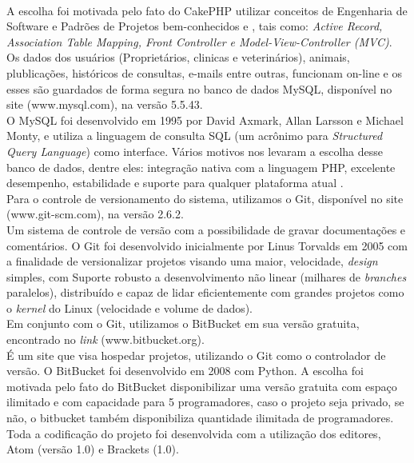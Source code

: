 \\
\indent
A escolha foi motivada pelo fato do CakePHP utilizar conceitos de Engenharia de Software e Padrões de Projetos bem-conhecidos
\cite{Gamma1994} e
\cite{Fowler2003}, tais como: {\it Active Record, Association Table Mapping, Front Controller e Model-View-Controller (MVC)}.
\\
\indent
Os dados dos usuários (Proprietários, clinicas e veterinários), animais, plublicações, históricos de consultas, e-mails entre outras, funcionam on-line e os esses são guardados de forma segura no banco de dados MySQL, disponível no site (www.mysql.com), na versão 5.5.43. 
\\
\indent
O MySQL foi desenvolvido em 1995 por David Axmark, Allan Larsson e Michael Monty, e utiliza a linguagem de consulta SQL (um acrônimo para {\it Structured Query Language}) como interface. Vários motivos nos levaram a escolha desse banco de dados, dentre eles: integração nativa com a linguagem PHP, excelente desempenho, estabilidade e suporte para qualquer plataforma atual \cite{Suehring2002}.
\\
\indent
Para o controle de versionamento do sistema, utilizamos o Git, disponível no site (www.git-scm.com), na versão 2.6.2. 
\\
\indent
Um sistema de controle de versão com a possibilidade de gravar documentações e comentários. O Git foi desenvolvido inicialmente por Linus Torvalds em 2005 com a finalidade de versionalizar projetos visando uma maior, velocidade, {\it design} simples, com Suporte robusto a desenvolvimento não linear (milhares de {\it branches} paralelos), distribuído e capaz de lidar eficientemente com grandes projetos como o {\it kernel} do Linux (velocidade e volume de dados).
\\
\indent 
Em conjunto com o Git, utilizamos o BitBucket em sua versão gratuita, encontrado no {\it link} (www.bitbucket.org).
\\
\indent
 É um site que visa hospedar projetos, utilizando o Git como o controlador de versão. O BitBucket foi desenvolvido em 2008 com Python. A escolha foi motivada pelo fato do BitBucket disponibilizar uma versão gratuita com espaço ilimitado e com capacidade para 5 programadores, caso o projeto seja privado, se não, o bitbucket também disponibiliza quantidade ilimitada de programadores.
\\
\indent
	Toda a codificação do projeto foi desenvolvida com a utilização dos editores, Atom (versão 1.0) e Brackets (1.0).
\\
\indent
